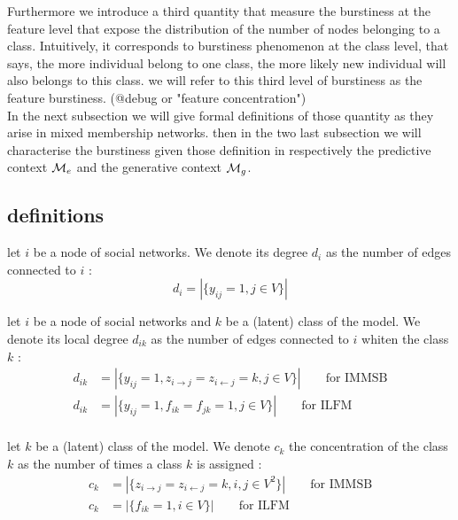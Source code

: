 Furthermore we introduce a third quantity that measure the burstiness at the feature level that expose the distribution of the number of nodes belonging to a class. Intuitively, it corresponds to burstiness phenomenon at the class level, that says, the more individual belong to one class, the more likely new individual will also belongs to this class. we will refer to this third level of burstiness as the {\large feature burstiness}. (@debug or "feature concentration") ~\\


In the next subsection we will give formal definitions of those quantity as they arise in mixed membership networks. then in the two last subsection we will characterise the burstiness given those definition in respectively the predictive context $\mathcal{M}_e$ and the generative context $\mathcal{M}_g$.

\subsection{definitions}
\label{sec:definitions}

\begin{definition}
    let $i$ be a node of social networks. We denote its degree $d_i$ as the number of edges connected to $i$ : 
    \begin{equation}
        d_i = |\{y_{ij}=1, j \in V\}|
    \end{equation}
\end{definition}

\begin{definition}
    let $i$ be a node of social networks and $k$ be a (latent) class of the model. We denote its local degree $d_{ik}$ as the number of edges connected to $i$ whiten the class $k$ : 
    \begin{align}
        d_{ik} &= |\{y_{ij}=1, z_{i\rightarrow j}=z_{i\leftarrow j}=k,  j \in V\}| \qquad \textrm{for IMMSB} \\
        d_{ik} &= |\{y_{ij}=1, f_{ik}=f_{jk}=1,  j \in V\}| \qquad \textrm{for ILFM} \\
    \end{align}
\end{definition}

\begin{definition}
    let $k$ be a (latent) class of the model. We denote $c_k$ the concentration of the class $k$ as the number of times a class $k$ is assigned : 
    \begin{align}
        c_{k} &= |\{ z_{i\rightarrow j}=z_{i\leftarrow j}=k,  i, j \in V^2\}| \qquad \textrm{for IMMSB} \\
        c_{k} &= |\{ f_{ik}=1,  i \in V\}| \qquad \textrm{for ILFM} \\
    \end{align}
\end{definition}


